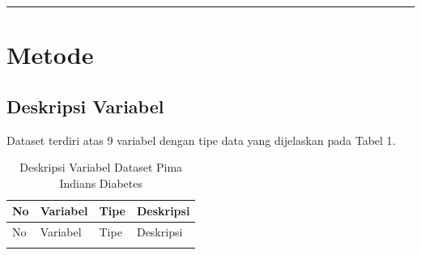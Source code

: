 \documentclass[
  11pt,
]{article}
\begin{document}
\begin{center}\rule{0.5\linewidth}{0.5pt}\end{center}

\section{Metode}\label{metode}

\subsection{Deskripsi Variabel}\label{deskripsi-variabel}

Dataset terdiri atas 9 variabel dengan tipe data yang dijelaskan pada
Tabel 1.

\begin{longtable}[]{@{}
  >{\raggedleft\arraybackslash}p{}
  >{\raggedright\arraybackslash}p{}
  >{\raggedright\arraybackslash}p{}
  >{\raggedright\arraybackslash}p{}@{}}
\caption{Deskripsi Variabel Dataset Pima Indians
Diabetes}\tabularnewline
\toprule\noalign{}
\begin{minipage}[b]{\linewidth}\raggedleft
No
\end{minipage} & \begin{minipage}[b]{\linewidth}\raggedright
Variabel
\end{minipage} & \begin{minipage}[b]{\linewidth}\raggedright
Tipe
\end{minipage} & \begin{minipage}[b]{\linewidth}\raggedright
Deskripsi
\end{minipage} \\
\midrule\noalign{}
\endfirsthead
\toprule\noalign{}
\begin{minipage}[b]{\linewidth}\raggedleft
No
\end{minipage} & \begin{minipage}[b]{\linewidth}\raggedright
Variabel
\end{minipage} & \begin{minipage}[b]{\linewidth}\raggedright
Tipe
\end{minipage} & \begin{minipage}[b]{\linewidth}\raggedright
Deskripsi
\end{minipage} \\
\midrule\noalign{}
\endhead

\end{longtable}
\end{document}
